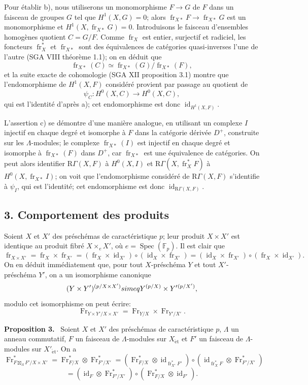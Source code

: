 \documentclass[11pt]{article}
\newenvironment{statement}[1]{\par\medskip\noindent\textbf{#1.}\ }{\par\medskip}
\DeclareMathOperator{\Spec}{Spec}
\providecommand{\et}{\mathrm{\acute{e}t}}
\providecommand{\RGamma}{\mathrm R\Gamma}
\providecommand{\id}{\operatorname{id}}
\providecommand{\id}{\operatorname{id}}
\providecommand{\id}{\operatorname{id}}
\providecommand{\RGamma}{\mathrm R\Gamma}
\providecommand{\id}{\operatorname{id}}
\providecommand{\Spec}{\operatorname{Spec}}
\providecommand{\Spec}{\operatorname{Spec}}
\providecommand{\id}{\operatorname{id}}
\providecommand{\Spec}{\operatorname{Spec}}
\providecommand{\fr}{\operatorname{fr}}
\providecommand{\Fr}{\operatorname{Fr}}
\providecommand{\Fr}{\operatorname{Fr}}
\providecommand{\fr}{\operatorname{fr}}
\providecommand{\Spec}{\operatorname{Spec}}
\providecommand{\id}{\operatorname{id}}
\providecommand{\RGamma}{\mathrm R\Gamma}
\providecommand{\et}{\acute{e}t}
\providecommand{\boxt}{\boxtimes}
\begin{document}
Pour établir b), nous utiliserons un monomorphisme $F\to G$ de $F$ dans un faisceau de groupes $G$ tel que $H^1(X,G)=0$; alors $\fr_{X*}F\to\fr_{X*}G$ est un monomorphisme et $H^1(X,\fr_{X*}G)=0$. Introduisons le faisceau d'ensembles homogènes quotient $C=G/F$. Comme $\fr_X$ est entier, surjectif et radiciel, les foncteurs $\fr_X^*$ et $\fr_{X*}$ sont des équivalences de catégories quasi-inverses l'une de l'autre (SGA VIII théorème 1.1); on en déduit que
\[
\fr_{X*}(C)\simeq\fr_{X*}(G)/\fr_{X*}(F),
\]
et la suite exacte de cohomologie (SGA XII proposition 3.1) montre que l'endomorphisme de $H^1(X,F)$ considéré provient par passage au quotient de
\[
\psi_C:H^0(X,C)\longrightarrow H^0(X,C),
\]
qui est l'identité d'après a); cet endomorphisme est donc $\id_{H^1(X,F)}$.

L'assertion c) se démontre d'une manière analogue, en utilisant un complexe $I$ injectif en chaque degré et isomorphe à $F$ dans la catégorie dérivée $D^+$, construite sur les $\Lambda$-modules; le complexe $\fr_{X*}(I)$ est injectif en chaque degré et isomorphe à $\fr_{X*}(F)$ dans $D^+$, car $\fr_{X*}$ est une équivalence de catégories. On peut alors identifier $\RGamma(X,F)$ à $H^0(X,I)$ et $\RGamma(X,\fr_X^*F)$ à $H^0(X,\fr_{X*}I)$; on voit que l'endomorphisme considéré de $\RGamma(X,F)$ s'identifie à $\psi_I$, qui est l'identité; cet endomorphisme est donc $\id_{\RGamma(X,F)}$.

\subsection*{3. Comportement des produits}

Soient $X$ et $X'$ des préschémas de caractéristique $p$; leur produit $X\times X'$ est identique au produit fibré $X\times_eX'$, où $e=\Spec(\mathbb F_p)$. Il est clair que
\[
\fr_{X\times X'}=\fr_X\times\fr_{X'}=(\fr_X\times\id_{X'})\circ(\id_X\times\fr_{X'})
=(\id_X\times\fr_{X'})\circ(\fr_X\times\id_{X'}).
\]
On en déduit immédiatement que, pour tout $X$-préschéma $Y$ et tout $X'$-préschéma $Y'$, on a un isomorphisme canonique
\[
(Y\times Y')^{(p/X\times X')}\\simeq Y^{(p/X)}\times Y'{}^{(p/X')},
\]
modulo cet isomorphisme on peut écrire:
\[
\Fr_{Y\times Y'/X\times X'}=\Fr_{Y/X}\times\Fr_{Y'/X'}.
\]

\begin{statement}{Proposition 3}
Soient $X$ et $X'$ des préschémas de caractéristique $p$, $\Lambda$ un anneau commutatif, $F$ un faisceau de $\Lambda$-modules sur $X_{\et}$ et $F'$ un faisceau de $\Lambda$-modules sur $X'_{\et}$. On a
\[
\Fr^*_{F\boxt_\Lambda F'/X\times X'}
=\Fr^*_{F/X}\otimes\Fr^*_{F'/X'}
=(\Fr^*_{F/X}\otimes\id_{\fr_{X'}^*F'})\circ
(\id_{\fr_X^*F}\otimes\Fr^*_{F'/X'})
\]
\[
=(\id_F\otimes\Fr^*_{F'/X'})\circ
(\Fr^*_{F/X}\otimes\id_{F'}).
\]
\end{statement}
\end{document}
